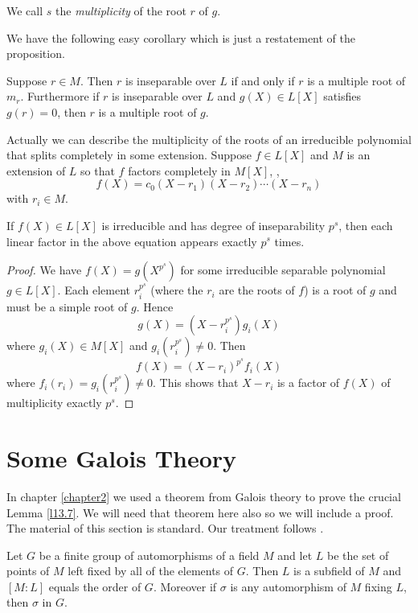 \begin{defi}
\label{d2.3.11}
We call $s$ the {\it multiplicity} of the root $r$ of $g$.
\end{defi}

We have the following easy corollary which is just a restatement of the proposition.

\begin{coro}
\label{c2.3.1}
Suppose $r\in M$. Then $r$ is inseparable over $L$ if and only if $r$ is a multiple root of $m_{r}$. Furthermore if $r$ is inseparable over $L$ and $g(X)\in L[X]$ satisfies $g(r)=0$, then $r$ is a multiple root of $g$.
\end{coro}
Actually we can describe the multiplicity of the roots of an irreducible polynomial that splits completely in some extension. Suppose $f\in L[X]$ and $M$ is an extension of $L$ so that $f$ factors completely in $M[X]$, \ie,
$$
f(X)=c_{0}(X-r_{1})(X-r_{2})\cdots(X-r_{n})
$$
with $r_{i}\in M$.

\begin{prop}
\label{p2.3.7}
If $f(X)\in L[X]$ is irreducible and has degree of inseparability $p^{s}$, then each linear factor in the above equation appears exactly $p^{s}$ times.
\end{prop}

\begin{proof}
We have $f(X)=g\left(X^{p^s}\right)$ for some irreducible separable polynomial $g\in L[X]$. Each element $r_{i}^{p^{s}}$ (where the $r_{i}$ are the roots of $f$) is a root of $g$ and must be a simple root of $g$. Hence
$$
g(X)=\left(X-r_i^{p^s}\right) g_{i}(X)
$$
where $g_{i}(X)\in M[X]$ and $g_{i}\left(r_{i}^{p^{s}}\right)\neq 0$. Then
$$
f(X)=\left(X-r_{i}\right)^{p^s}f_{i}(X)
$$
where $f_{i}(r_{i})=g_{i}\left(r_{i}^{p^{s}}\right)\neq 0$. This shows that $X-r_{i}$ is a factor of $f(X)$ of multiplicity exactly $p^{s}$.
\end{proof}

\section{Some Galois Theory}
\label{sec2.4}

In chapter \ref{chapter2} we used a theorem from Galois theory to prove the crucial Lemma \ref{l13.7}. We will need that theorem here also so we will include a proof. The material of this section is standard. Our treatment follows \cite{r2.1}.

\begin{theo}
\label{t2.4.3}
Let $G$ be a finite group of automorphisms of a field $M$ and let $L$ be the set of points of $M$ left fixed by all of the elements of $G$. Then $L$ is a subfield of $M$ and $[M:L]$ equals the order of $G$. Moreover if $\sigma$ is any automorphism of $M$ fixing $L$, then $\sigma$ in $G$.
\end{theo}

